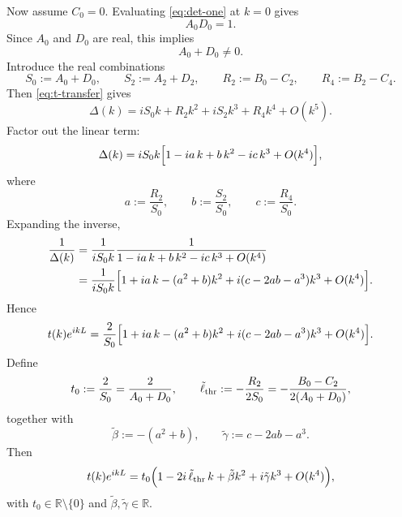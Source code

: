 \documentclass[aps,pra,preprint,notitlepage,nofootinbib]{revtex4-2}
\begin{document}
Now assume $C_0=0$. Evaluating \eqref{eq:det-one} at $k=0$ gives
\begin{equation}
A_0D_0=1.
\label{eq:AD-one}
\end{equation}
Since $A_0$ and $D_0$ are real, this implies
\begin{equation}
A_0+D_0\neq0.
\label{eq:S0-nonzero}
\end{equation}
Introduce the real combinations
\begin{equation}
S_0:=A_0+D_0,
\qquad
S_2:=A_2+D_2,
\qquad
R_2:=B_0-C_2,
\qquad
R_4:=B_2-C_4.
\label{eq:exc-combos}
\end{equation}
Then \eqref{eq:t-transfer} gives
\begin{equation}
\Delta(k)
=
iS_0k+R_2k^2+iS_2k^3+R_4k^4+O(k^5).
\label{eq:Delta-exc}
\end{equation}
Factor out the linear term:
\begin{equation}
\Delta(k)
=
iS_0k
\Bigl[
1-ia\,k+b\,k^2-ic\,k^3+O(k^4)
\Bigr],
\label{eq:Delta-exc-factor}
\end{equation}
where
\begin{equation}
a:=\frac{R_2}{S_0},
\qquad
b:=\frac{S_2}{S_0},
\qquad
c:=\frac{R_4}{S_0}.
\label{eq:abc-exc}
\end{equation}
Expanding the inverse,
\begin{align}
\frac{1}{\Delta(k)}
&=
\frac{1}{iS_0k}
\frac{1}{1-ia\,k+b\,k^2-ic\,k^3+O(k^4)}
\nonumber\\
&=
\frac{1}{iS_0k}
\Bigl[
1+ia\,k-(a^2+b)k^2+i(c-2ab-a^3)k^3+O(k^4)
\Bigr].
\label{eq:exc-inverse}
\end{align}
Hence
\begin{equation}
t(k)e^{ikL}
=
\frac{2}{S_0}
\Bigl[
1+ia\,k-(a^2+b)k^2+i(c-2ab-a^3)k^3+O(k^4)
\Bigr].
\end{equation}
Define
\begin{equation}
t_0:=\frac{2}{S_0}=\frac{2}{A_0+D_0},
\qquad
\tilde\ell_{\rm thr}:=-\frac{R_2}{2S_0}
=-\frac{B_0-C_2}{2(A_0+D_0)},
\label{eq:t0-elltilde-def}
\end{equation}
together with
\begin{equation}
\tilde\beta:=-(a^2+b),
\qquad
\tilde\gamma:=c-2ab-a^3.
\end{equation}
Then
\begin{equation}
t(k)e^{ikL}
=
t_0
\Bigl(
1-2i\,\tilde\ell_{\rm thr}\,k+\tilde\beta k^2+i\tilde\gamma k^3+O(k^4)
\Bigr),
\label{eq:t-exc-final-app}
\end{equation}
with $t_0\in\mathbb R\setminus\{0\}$ and $\tilde\beta,\tilde\gamma\in\mathbb R$.
\end{document}
